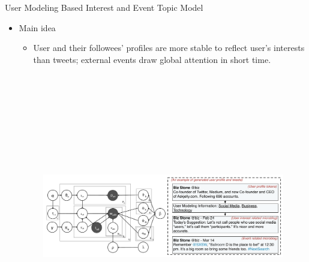 \documentclass{beamer}
\begin{document}
\begin{frame}
\begin{columns}[T]
\begin{column}{.46\textwidth}
{\begin{block}{User Modeling Based Interest and Event Topic Model}
\begin{itemize}
\item Main idea 
        \begin{itemize}
                \item User and their followees' profiles are more stable to reflect user's interests than tweets; external events draw global attention in short time.
        \end{itemize}
	\begin{figure}
		\centering
		\includegraphics[height=12.5cm]{img/model.pdf}
		\label{fig:Illustration of UPIETM}
	\end{figure} 


\end{itemize}
\end{block}}
\end{column}
\end{columns}
\end{frame}
\end{document}
